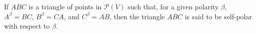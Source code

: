 If $ABC$ is a triangle of points in $\mathcal{P}(V)$ such that, for a given polarity $\beta$, $A^\beta = BC$, $B^\beta = CA$, and $C^\beta = AB$, then the triangle $ABC$ is said to be self-polar with respect to $\beta$.
